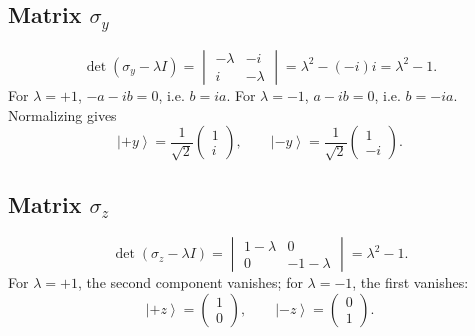 \documentclass[11pt,a4paper]{article}
\theoremstyle{definition}
\newcommand{\ket}[1]{\left|#1\right\rangle}
\begin{document}
\subsection{Matrix \(\sigma_y\)}
\begin{equation}
\det(\sigma_y-\lambda I)=\begin{vmatrix}-\lambda&-i\\i&-\lambda\end{vmatrix}
=\lambda^2-(-i)i=\lambda^2-1.
\end{equation}
For \(\lambda=+1\), \(-a-ib=0\), i.e. \(b=ia\). For \(\lambda=-1\), \(a-ib=0\), i.e. \(b=-ia\). Normalizing gives
\begin{equation}
\boxed{\ket{+y}=\frac1{\sqrt2}\begin{pmatrix}1\\i\end{pmatrix},\qquad
\ket{-y}=\frac1{\sqrt2}\begin{pmatrix}1\\-i\end{pmatrix}.}
\end{equation}
\subsection{Matrix \(\sigma_z\)}
\begin{equation}
\det(\sigma_z-\lambda I)=\begin{vmatrix}1-\lambda&0\\0&-1-\lambda\end{vmatrix}
=\lambda^2-1.
\end{equation}
For \(\lambda=+1\), the second component vanishes; for \(\lambda=-1\), the first vanishes:
\begin{equation}
\boxed{\ket{+z}=\begin{pmatrix}1\\0\end{pmatrix},\qquad
\ket{-z}=\begin{pmatrix}0\\1\end{pmatrix}.}
\end{equation}
\end{document}
